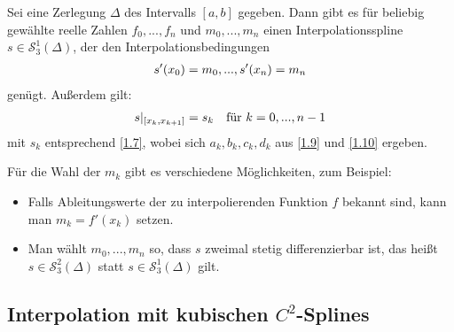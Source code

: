 \begin{proposition}
	Sei eine Zerlegung $\Delta$ des Intervalls $[a,b]$ gegeben. Dann gibt es für beliebig gewählte reelle Zahlen $f_0,...,f_n$ und $m_0,...,m_n$ einen Interpolationsspline $s\in\mathcal{S}^1_3(\Delta)$, der den Interpolationsbedingungen
	\begin{align}
		s'(x_0)=m_0,...,s'(x_n)=m_n\notag
	\end{align}
	genügt. Außerdem gilt:
	\begin{align}
		s\vert_{[x_k,x_{k+1}]}=s_k\quad\text{für } k=0,...,n-1\notag
	\end{align}
	mit $s_k$ entsprechend \cref{1.7}, wobei sich $a_k,b_k,c_k,d_k$ aus \cref{1.9} und \cref{1.10} ergeben.
\end{proposition}

Für die Wahl der $m_k$ gibt es verschiedene Möglichkeiten, zum Beispiel:
\begin{itemize}
	\item Falls Ableitungswerte der zu interpolierenden Funktion $f$ bekannt sind, kann man $m_k=f'(x_k)$ setzen.
	\item Man wählt $m_0,...,m_n$ so, dass $s$ zweimal stetig differenzierbar ist, das heißt $s\in\mathcal{S}^2_3(\Delta)$ statt  $s\in\mathcal{S}^1_3(\Delta)$ gilt.
\end{itemize}

\subsection{Interpolation mit kubischen $C^2$-Splines}

